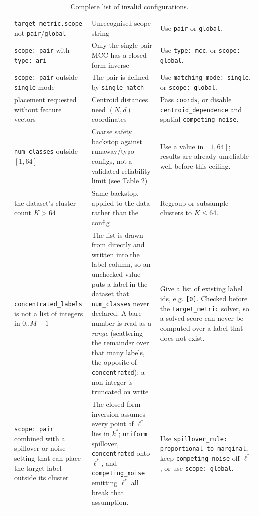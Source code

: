 \documentclass[a4paper,11pt]{article}
\newcommand{\vcode}[1]{\textcolor{valred}{\bfseries\ttfamily #1}}
\begin{document}
\begin{longtable}{@{}L{1.0cm} L{3.5cm} L{4.6cm} L{5.4cm}@{}}
\vcode{122} & \texttt{target\_metric.scope} not \texttt{pair}/\texttt{global} & Unrecognised scope string & Use \texttt{pair} or \texttt{global}. \\
\vcode{123} & \texttt{scope: pair} with \texttt{type: ari} & Only the single-pair MCC has a closed-form inverse & Use \texttt{type: mcc}, or \texttt{scope: global}. \\
\vcode{124} & \texttt{scope: pair} outside \texttt{single} mode & The pair is defined by \texttt{single\_match} & Use \texttt{matching\_mode: single}, or \texttt{scope: global}. \\
\vcode{125} & placement requested without feature vectors & Centroid distances need $(N,d)$ coordinates & Pass \texttt{coords}, or disable \texttt{centroid\_dependence} and spatial \texttt{competing\_noise}. \\
\vcode{126} & \texttt{num\_classes} outside $[1,64]$ & Coarse safety backstop against runaway/typo configs, not a validated reliability limit (see Table 2) & Use a value in $[1,64]$; results are already unreliable well before this ceiling. \\
\vcode{127} & the dataset's cluster count $K > 64$ & Same backstop, applied to the data rather than the config & Regroup or subsample clusters to $K\leq64$. \\
\vcode{128} & \texttt{concentrated\_labels} is not a list of integers in $0..M{-}1$ & The list is drawn from directly and written into the label column, so an unchecked value puts a label in the dataset that \texttt{num\_classes} never declared. A bare number is read as a \emph{range} (scattering the remainder over that many labels, the opposite of \texttt{concentrated}); a non-integer is truncated on write & Give a list of existing label ids, e.g. \texttt{[0]}. Checked before the \texttt{target\_metric} solver, so a solved score can never be computed over a label that does not exist. \\
\vcode{130} & \texttt{scope: pair} combined with a spillover or noise setting that can place the target label outside its cluster & The closed-form inversion assumes every point of $\ell^*$ lies in $k^*$; \texttt{uniform} spillover, \texttt{concentrated} onto $\ell^*$, and \texttt{competing\_noise} emitting $\ell^*$ all break that assumption. & Use \texttt{spillover\_rule: proportional\_to\_marginal}, keep \texttt{competing\_noise} off $\ell^*$, or use \texttt{scope: global}. \\
\bottomrule
\caption{Complete list of invalid configurations.}
\label{LIC}
\end{longtable}
\end{document}
